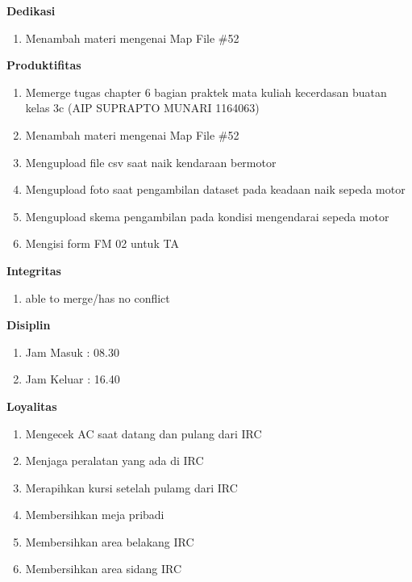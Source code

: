 \begin{enumerate}
\textbf{Dedikasi}
\begin{enumerate}
\item Menambah materi mengenai Map File \#52
\end{enumerate}

\textbf{Produktifitas}
\begin{enumerate}
\item Memerge tugas chapter 6 bagian praktek mata kuliah kecerdasan buatan kelas 3c (AIP SUPRAPTO MUNARI 1164063)
\item Menambah materi mengenai Map File \#52
\item Mengupload file csv saat naik kendaraan bermotor
\item Mengupload foto saat pengambilan dataset pada keadaan naik sepeda motor
\item Mengupload skema pengambilan pada kondisi mengendarai sepeda motor
\item Mengisi form FM 02 untuk TA
\end{enumerate}

\textbf{Integritas}
\begin{enumerate}
\item able to merge/has no conflict
\end{enumerate}

\textbf{Disiplin}
\begin{enumerate}
\item Jam Masuk : 08.30
\item Jam Keluar : 16.40
\end{enumerate}

\textbf{Loyalitas}
\begin{enumerate}
\item Mengecek AC saat datang dan pulang dari IRC
\item Menjaga peralatan yang ada di IRC
\item Merapihkan kursi setelah pulamg dari IRC
\item Membersihkan meja pribadi
\item Membersihkan area belakang IRC
\item Membersihkan area sidang IRC
\end{enumerate}
\end{enumerate}


